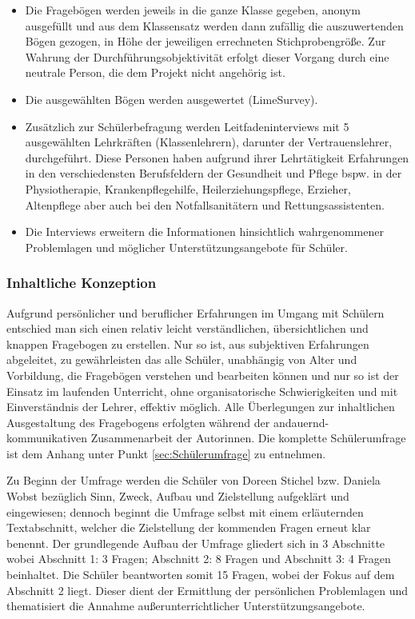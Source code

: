 \begin{itemize}
	\item Die Fragebögen werden jeweils in die ganze Klasse gegeben, anonym ausgefüllt und aus dem Klassensatz werden dann zufällig die auszuwertenden Bögen gezogen, in Höhe der jeweiligen errechneten Stichprobengröße. Zur Wahrung der Durchführungsobjektivität erfolgt dieser Vorgang durch eine neutrale Person, die dem Projekt nicht angehörig ist. 
	\item Die ausgewählten Bögen werden ausgewertet (LimeSurvey).
	\item Zusätzlich zur Schülerbefragung werden Leitfadeninterviews mit 5 ausgewählten Lehrkräften (Klassenlehrern), darunter der Vertrauenslehrer, durchgeführt. Diese Personen haben aufgrund ihrer Lehrtätigkeit Erfahrungen in den verschiedensten Berufsfeldern der Gesundheit und Pflege bspw. in der Physiotherapie, Krankenpflegehilfe, Heilerziehungspflege, Erzieher, Altenpflege aber auch bei den Notfallsanitätern und Rettungsassistenten.
	\item Die Interviews erweitern die Informationen hinsichtlich wahrgenommener Problemlagen und möglicher Unterstützungsangebote für Schüler.
\end{itemize}

\subsubsection{Inhaltliche Konzeption}
\label{sec:InhaltlicheKonzeption}

Aufgrund persönlicher und beruflicher Erfahrungen im Umgang mit Schülern entschied man sich einen relativ leicht verständlichen, übersichtlichen und knappen Fragebogen zu erstellen. Nur so ist, aus subjektiven Erfahrungen abgeleitet, zu gewährleisten das alle Schüler, unabhängig von Alter und Vorbildung, die Fragebögen verstehen und bearbeiten können und nur so ist der Einsatz im laufenden Unterricht, ohne organisatorische Schwierigkeiten und mit Einverständnis der Lehrer, effektiv möglich. Alle Überlegungen zur inhaltlichen Ausgestaltung des Fragebogens erfolgten während der andauernd-kommunikativen Zusammenarbeit der Autorinnen. Die komplette Schülerumfrage ist dem Anhang unter Punkt \ref{sec:Schülerumfrage} zu entnehmen.

Zu Beginn der Umfrage werden die Schüler von Doreen Stichel bzw. Daniela Wobst bezüglich Sinn, Zweck, Aufbau und Zielstellung aufgeklärt und eingewiesen; dennoch beginnt die Umfrage selbst mit einem erläuternden Textabschnitt, welcher die Zielstellung der kommenden Fragen erneut klar benennt. Der grundlegende Aufbau der Umfrage gliedert sich in 3 Abschnitte wobei Abschnitt 1: 3 Fragen; Abschnitt 2: 8 Fragen und Abschnitt 3: 4 Fragen beinhaltet. Die Schüler beantworten somit 15 Fragen, wobei der Fokus auf dem Abschnitt 2 liegt. Dieser dient der Ermittlung der persönlichen Problemlagen und thematisiert die Annahme außerunterrichtlicher Unterstützungsangebote. 

